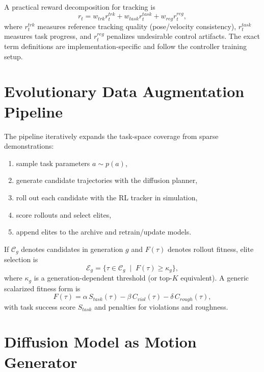 \begin{itemize}
A practical reward decomposition for tracking is
\begin{equation}
r_t = w_{trk} r_t^{trk} + w_{task} r_t^{task} + w_{reg} r_t^{reg},
\label{eq:tracker_reward_decomp}
\end{equation}
where $r_t^{trk}$ measures reference tracking quality (pose/velocity consistency), $r_t^{task}$ measures task progress, and $r_t^{reg}$ penalizes undesirable control artifacts. The exact term definitions are implementation-specific and follow the controller training setup.

\section{Evolutionary Data Augmentation Pipeline}
\label{sec:evolutionary_pipeline}

The pipeline iteratively expands the task-space coverage from sparse demonstrations:
\begin{enumerate}
    \item sample task parameters $a \sim p(a)$,
    \item generate candidate trajectories with the diffusion planner,
    \item roll out each candidate with the RL tracker in simulation,
    \item score rollouts and select elites,
    \item append elites to the archive and retrain/update models.
\end{enumerate}

If $\mathcal{C}_g$ denotes candidates in generation $g$ and $F(\tau)$ denotes rollout fitness, elite selection is
\begin{equation}
\mathcal{E}_g = \{\tau \in \mathcal{C}_g \;\mid\; F(\tau) \ge \kappa_g\},
\label{eq:elite_selection}
\end{equation}
where $\kappa_g$ is a generation-dependent threshold (or top-$K$ equivalent). A generic scalarized fitness form is
\begin{equation}
F(\tau)=\alpha\,S_{task}(\tau)-\beta\,C_{viol}(\tau)-\delta\,C_{rough}(\tau),
\label{eq:fitness_scalar}
\end{equation}
with task success score $S_{task}$ and penalties for violations and roughness.

\section{Diffusion Model as Motion Generator}
\label{sec:diffusion_in_evo}


\end{itemize}
